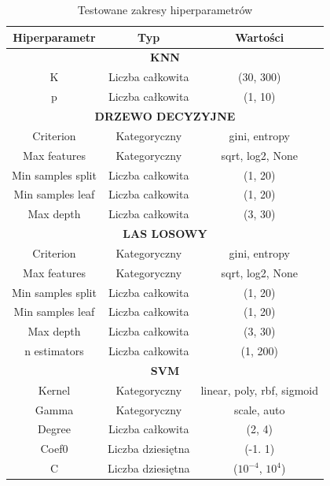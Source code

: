 \documentclass[a4paper,twoside,12pt]{book}
\begin{document}
\begin{table}[!h]
	\centering
	\caption{Testowane zakresy hiperparametrów}
	\label{tab:hiperparametry}
	\begin{tabular}{@{}ccc@{}}
		\toprule
		\textbf{Hiperparametr} & \textbf{Typ}      & \textbf{Wartości}          \\ \midrule
		\multicolumn{3}{c}{\textbf{KNN}}                                        \\ \midrule
		K                      & Liczba całkowita  & (30, 300)                  \\
		p                      & Liczba całkowita  & (1, 10)                    \\ \midrule
		\multicolumn{3}{c}{\textbf{DRZEWO DECYZYJNE}}                           \\ \midrule
		Criterion              & Kategoryczny      & gini, entropy              \\
		Max features           & Kategoryczny      & sqrt, log2, None           \\
		Min samples split      & Liczba całkowita  & (1, 20)                    \\
		Min samples leaf       & Liczba całkowita  & (1, 20)                    \\
		Max depth              & Liczba całkowita  & (3, 30)                    \\ \midrule
		\multicolumn{3}{c}{\textbf{LAS LOSOWY}}                                 \\ \midrule
		Criterion              & Kategoryczny      & gini, entropy              \\
		Max features           & Kategoryczny      & sqrt, log2, None           \\
		Min samples split      & Liczba całkowita  & (1, 20)                    \\
		Min samples leaf       & Liczba całkowita  & (1, 20)                    \\
		Max depth              & Liczba całkowita  & (3, 30)                    \\
		n estimators           & Liczba całkowita  & (1, 200)                   \\ \midrule
		\multicolumn{3}{c}{\textbf{SVM}}                                        \\ \midrule
		Kernel                 & Kategoryczny      & linear, poly, rbf, sigmoid \\
		Gamma                  & Kategoryczny      & scale, auto                \\
		Degree                 & Liczba całkowita  & (2, 4)                     \\
		Coef0                  & Liczba dziesiętna & (-1. 1)                    \\
		C                      & Liczba dziesiętna & ($10^{-4}$,  $10^{4}$)     \\ \bottomrule
	\end{tabular}
\end{table}
\newpage
\end{document}
